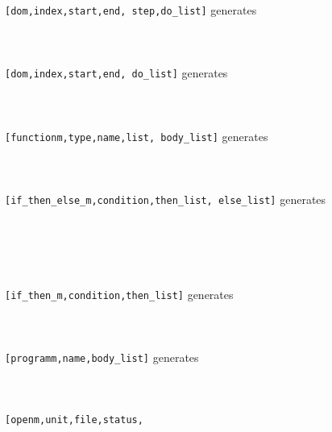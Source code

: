 \begin{tabbing}
  {\tt [dom,{\rm index},{\rm start},{\rm end},
       {\rm step},{\rm do\_list}]}
     \>generates 
     \\
  \> \\
  \> \\\\
  {\tt [dom,{\rm index},{\rm start},{\rm end},
       {\rm do\_list}]}
     \>generates 
     \\
    \> \\
    \> \\\\
  {\tt [functionm,{\rm type},{\rm name},{\rm list},
       {\rm body\_list}]} 
     \>generates
     \\
    \> \\
    \> \\\\
  {\tt [if\_then\_else\_m,{\rm condition},{\rm then\_list},
       {\rm else\_list}]}
     \>generates 
     \\
    \> \\
    \> \\
    \> \\
    \> \\\\
  {\tt [if\_then\_m,{\rm condition},{\rm then\_list}]}
     \>generates 
     \\
    \> \\
    \> \\\\
  {\tt [programm,{\rm name},{\rm body\_list}]} \>generates
     \\
    \> \\
    \> \\\\
  {\tt [openm,{\rm unit},{\rm file},{\rm status},
}
\end{tabbing}

